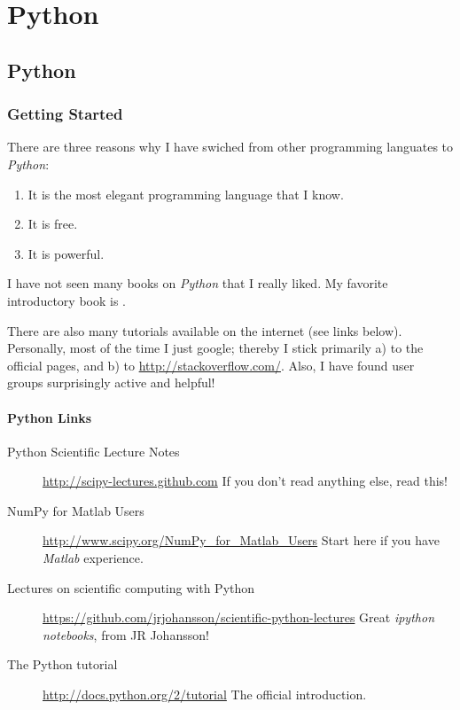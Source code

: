 \part{Python}

\chapter{Python}

\section{Getting Started}

There are three reasons why I have swiched from other programming languates to \emph{Python}:

\begin{enumerate}
  \item It is the most elegant programming language that I know.
  \item It is free.
  \item It is powerful.
\end{enumerate}

I have not seen many books on \emph{Python} that I really liked. My favorite introductory book is \cite{Harms2010}.

There are also many tutorials available on the internet (see links below). Personally, most of the time I just google; thereby I stick primarily a) to the official pages, and b) to \url{http://stackoverflow.com/}. Also, I have found user groups surprisingly active and helpful!

\subsection{Python Links}

\begin{description}
  \item[Python Scientific Lecture Notes] \url{http://scipy-lectures.github.com} If you don't read anything else, read this!
  \item[NumPy for Matlab Users] \url{http://www.scipy.org/NumPy\_for\_Matlab\_Users} Start here if you have \emph{Matlab} experience.
  \item[Lectures on scientific computing with Python] \url{https://github.com/jrjohansson/scientific-python-lectures} Great \emph{ipython notebooks}, from JR Johansson!
  \item[The Python tutorial] \url{http://docs.python.org/2/tutorial} The official introduction.
\end{description}

